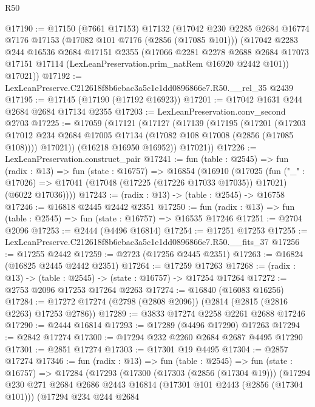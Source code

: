 \begin{lexlean}{R50}
\begin{coremodule}
@17190 := @17150
    (@7661 @17153)
    @17132
    (@17042
      @230
      @2285
      @2684
      @16774
      @7176
      @17153
      (@17082 @101 @7176 (@2856 (@17085 @101)))
      (@17042
        @2283
        @244
        @16536
        @2684
        @17151
        @2355
        (@17066
          @2281
          @2278
          @2688
          @2684
          @17073
          @17151
          @17114
          (LexLeanPreservation.prim_natRem @16920 @2442 @101))
        @17021))
@17192 := LexLeanPreserve.C212618f8b6ebac3a5c1e1dd0896866e7.R50.__rel_35 @2439
@17195 := @17145 (@17190 (@17192 @16923))
@17201 := @17042 @1631 @244 @2684 @2684 @17134 @2355
@17203 := LexLeanPreservation.conv_second @2703
@17225 := @17059
    (@17121
      (@17127
        (@17139
          (@17195
            (@17201
              (@17203 @17012 @234 @2684 @17005 @17134 (@17082 @108 @17008 (@2856 (@17085 @108))))
              @17021))
          (@16218 @16950 @16952))
        @17021))
@17226 := LexLeanPreservation.construct_pair
@17241 := fun (table : @2545) =>
  fun (radix : @13) =>
  fun (state : @16757) =>
  @16854
    (@16910
      (@17025
        (fun ("_" : @17026) =>
        @17041 (@17048 (@17225 (@17226 @17033 @17035)) @17021) (@6022 @17036))))
@17243 := (radix : @13) -> (table : @2545) -> @16758
@17246 := @16818 @2445 @2442 @2351
@17250 := fun (radix : @13) => fun (table : @2545) => fun (state : @16757) => @16535 @17246
@17251 := @2704 @2096
@17253 := @2444 (@4496 @16814)
@17254 := @17251 @17253
@17255 := LexLeanPreserve.C212618f8b6ebac3a5c1e1dd0896866e7.R50.__fits_37
@17256 := @17255 @2442
@17259 := @2723 (@17256 @2445 @2351)
@17263 := @16824 (@16825 @2445 @2442 @2351)
@17264 := @17259 @17263
@17268 := (radix : @13) -> (table : @2545) -> (state : @16757) -> @17254 @17264
@17272 := @2753 @2096 @17253 @17264 @2263
@17274 := @16840 (@16083 @16256)
@17284 := @17272 @17274 (@2798 (@2808 @2096)) (@2814 (@2815 (@2816 @2263) @17253 @2786))
@17289 := @3833 @17274 @2258 @2261 @2688 @17246
@17290 := @2444 @16814
@17293 := @17289 (@4496 @17290) @17263
@17294 := @2842 @17274
@17300 := @17294 @232 @2260 @2684 @2687 @4495 @17290
@17301 := @2851 @17274
@17303 := @17301 @19 @4495
@17304 := @2857 @17274
@17346 := fun (radix : @13) =>
  fun (table : @2545) =>
  fun (state : @16757) =>
  @17284
    (@17293
      (@17300
        (@17303 (@2856 (@17304 @19)))
        (@17294
          @230
          @271
          @2684
          @2686
          @2443
          @16814
          (@17301 @101 @2443 (@2856 (@17304 @101)))
          (@17294
            @234
            @244
            @2684

\end{coremodule}
\end{lexlean}
